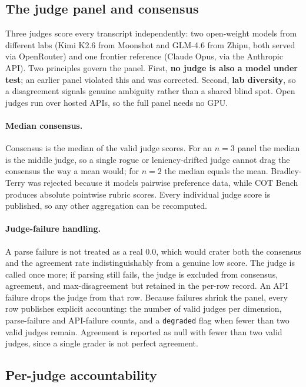 \subsection{The judge panel and consensus}

Three judges score every transcript independently: two open-weight models from
different labs (Kimi K2.6 from Moonshot and GLM-4.6 from Zhipu, both served via
OpenRouter) and one frontier reference (Claude Opus, via the Anthropic API). Two
principles govern the panel. First, \textbf{no judge is also a model under test};
an earlier panel violated this and was corrected. Second, \textbf{lab diversity},
so a disagreement signals genuine ambiguity rather than a shared blind spot. Open
judges run over hosted APIs, so the full panel needs no GPU.

\paragraph{Median consensus.} Consensus is the median of the valid judge scores.
For an $n=3$ panel the median is the middle judge, so a single rogue or
leniency-drifted judge cannot drag the consensus the way a mean would; for $n=2$ the
median equals the mean. Bradley-Terry was rejected because it models pairwise
preference data, while COT Bench produces absolute pointwise rubric scores. Every
individual judge score is published, so any other aggregation can be recomputed.

\paragraph{Judge-failure handling.} A parse failure is not treated as a real 0.0,
which would crater both the consensus and the agreement rate indistinguishably from
a genuine low score. The judge is called once more; if parsing still fails, the
judge is excluded from consensus, agreement, and max-disagreement but retained in
the per-row record. An API failure drops the judge from that row. Because failures
shrink the panel, every row publishes explicit accounting: the number of valid
judges per dimension, parse-failure and API-failure counts, and a \texttt{degraded}
flag when fewer than two valid judges remain. Agreement is reported as null with
fewer than two valid judges, since a single grader is not perfect agreement.

\subsection{Per-judge accountability}

